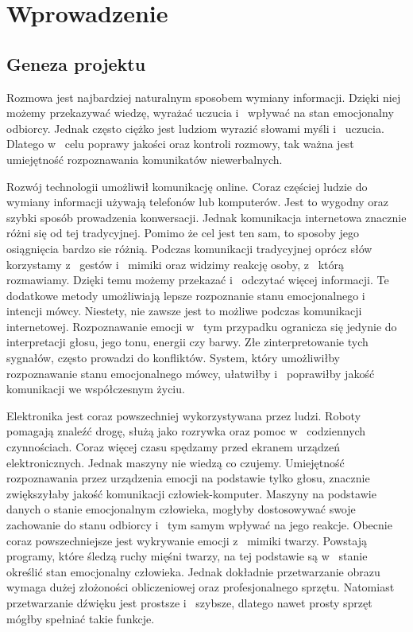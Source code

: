 \documentclass[declaration,shortabstract]{iithesis}
\author         {Elżbieta Plaszczyk}
\begin{document}
\let\cleardoublepage\clearpage
\chapter{Wprowadzenie}
\section{Geneza projektu}
Rozmowa jest najbardziej naturalnym sposobem wymiany informacji. Dzięki niej możemy przekazywać wiedzę, wyrażać uczucia i~ wpływać na stan emocjonalny odbiorcy.  Jednak często ciężko jest ludziom wyrazić słowami myśli i~ uczucia. Dlatego w~ celu poprawy jakości oraz kontroli rozmowy, tak ważna jest umiejętność rozpoznawania komunikatów niewerbalnych. 

Rozwój technologii umożliwił komunikację online. Coraz częściej ludzie do wymiany informacji używają telefonów lub komputerów. Jest to wygodny oraz szybki sposób prowadzenia konwersacji. Jednak komunikacja internetowa znacznie różni się od tej tradycyjnej. Pomimo że cel jest ten sam, to sposoby jego osiągnięcia bardzo sie różnią. Podczas komunikacji tradycyjnej oprócz słów korzystamy z~ gestów i~ mimiki oraz widzimy reakcję osoby, z~ którą rozmawiamy. Dzięki temu możemy przekazać i~ odczytać więcej informacji. Te dodatkowe metody umożliwiają lepsze rozpoznanie stanu emocjonalnego i~ intencji mówcy. Niestety, nie zawsze jest to możliwe podczas komunikacji internetowej. Rozpoznawanie emocji w~ tym przypadku ogranicza się jedynie do interpretacji głosu, jego tonu, energii czy barwy. Złe zinterpretowanie tych sygnałów, często prowadzi do konfliktów. System, który umożliwiłby rozpoznawanie stanu emocjonalnego mówcy, ułatwiłby i~ poprawiłby jakość komunikacji we współczesnym życiu. 

Elektronika jest coraz powszechniej wykorzystywana przez ludzi. Roboty pomagają znaleźć drogę, służą jako rozrywka oraz pomoc w~ codziennych czynnościach. Coraz więcej czasu spędzamy przed ekranem urządzeń elektronicznych. Jednak maszyny nie wiedzą co czujemy. Umiejętność rozpoznawania przez urządzenia emocji na podstawie tylko głosu, znacznie zwiększyłaby jakość komunikacji człowiek-komputer. Maszyny na podstawie danych o stanie emocjonalnym człowieka, mogłyby dostosowywać swoje zachowanie do stanu odbiorcy i~ tym samym wpływać na jego reakcje. Obecnie coraz powszechniejsze jest wykrywanie emocji z~ mimiki twarzy. Powstają programy, które śledzą ruchy mięśni twarzy, na tej podstawie są w~ stanie określić stan emocjonalny człowieka. Jednak dokładnie przetwarzanie obrazu wymaga dużej złożoności obliczeniowej oraz profesjonalnego sprzętu. Natomiast przetwarzanie dźwięku jest prostsze i~ szybsze, dlatego nawet prosty sprzęt mógłby spełniać takie funkcje.
\end{document}
